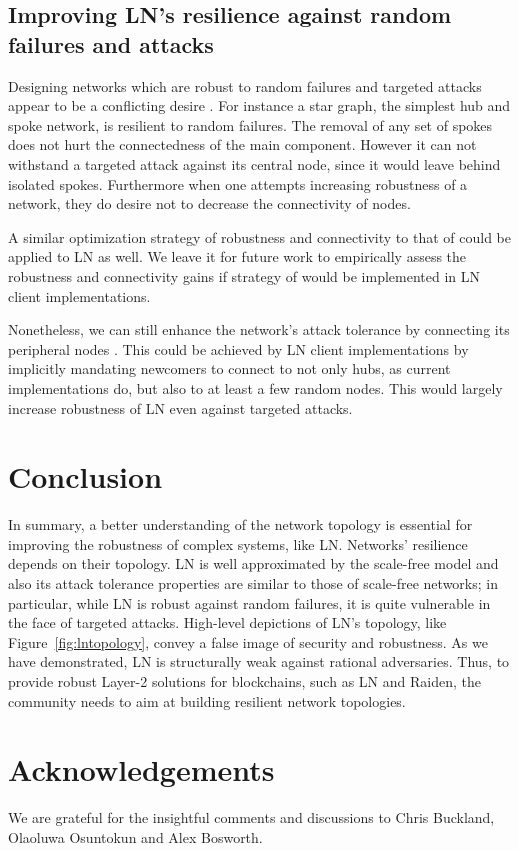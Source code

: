 \documentclass[a4paper]{article}
\theoremstyle{definition}
\begin{document}
\subsection{Improving LN's resilience against random failures and attacks}
Designing networks which are robust to random failures and targeted attacks appear to be a conflicting desire \cite{barabasi2016network}. For instance a star graph, the simplest hub and spoke network, is resilient to random failures. The removal of any set of spokes does not hurt the connectedness of the main component. However it can not withstand a targeted attack against its central node, since it would leave behind isolated spokes. Furthermore when one attempts increasing robustness of a network, they do desire not to decrease the connectivity of nodes.

A similar optimization strategy of robustness and connectivity to that of \cite{shargel2003optimization} could be applied to LN as well. We leave it for future work to empirically assess the robustness and connectivity gains if strategy of \cite{shargel2003optimization} would be implemented in LN client implementations. 

Nonetheless, we can still enhance the network's attack tolerance by connecting its peripheral nodes \cite{barabasi2016network}. This could be achieved by LN client implementations by implicitly mandating newcomers to connect to not only hubs, as current implementations do, but also to at least a few random nodes. This would largely increase robustness of LN even against targeted attacks. 

\section{Conclusion}
In summary, a better understanding of the network topology is essential
for improving the robustness of complex systems, like LN. Networks' resilience depends on their topology. LN is well approximated by the scale-free model and also its attack tolerance properties are similar to those of scale-free networks; in particular, while LN is robust against random failures, it is quite vulnerable in the face of targeted attacks. 
High-level depictions of LN's topology, like Figure~\ref{fig:lntopology}, convey a false image of security and robustness. As we have demonstrated, LN is structurally weak against rational adversaries. Thus, to provide robust Layer-2 solutions for blockchains, such as LN and Raiden, the community needs to aim at building resilient network topologies.
\section{Acknowledgements}
We are grateful for the insightful comments and discussions to Chris Buckland, Olaoluwa Osuntokun and Alex Bosworth.



\end{document}
